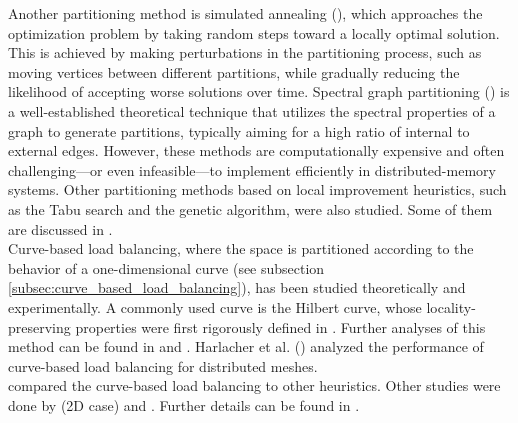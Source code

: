 Another partitioning method is simulated annealing (\cite{SIMULATED_ANNEALING,YANIV}), which approaches the optimization problem by taking random steps toward a locally optimal solution. This is achieved by making perturbations in the partitioning process, such as moving vertices between different partitions, while gradually reducing the likelihood of accepting worse solutions over time.
Spectral graph partitioning (\cite{RSB}) is a well-established theoretical technique that utilizes the spectral properties of a graph to generate partitions, typically aiming for a high ratio of internal to external edges. However, these methods are computationally expensive and often challenging—or even infeasible—to implement efficiently in distributed-memory systems.
Other partitioning methods based on local improvement heuristics, such as the Tabu search and the genetic algorithm, were also studied. Some of them are discussed in \cite{survey}. \\
Curve-based load balancing, where the space is partitioned according to the behavior of a one-dimensional curve (see subsection \ref{subsec:curve_based_load_balancing}), has been studied theoretically and experimentally. A commonly used curve is the Hilbert curve, whose locality-preserving properties were first rigorously defined in \cite{499920}. Further analyses of this method can be found in \cite{908985} and \cite{BaumanK.E.2006Tdfo}.
Harlacher et al. (\cite{curve_balancing_comparison}) analyzed the performance of curve-based load balancing for distributed meshes. \\
\cite{BORRELL2018264} compared the curve-based load balancing to other heuristics. Other studies were done by \cite{7336274} (2D case) and \cite{hilbert_testing}. 
Further details can be found in \cite{MIZRACHI}.
